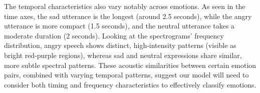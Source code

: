 \documentclass[../main.tex]{subfiles}
\begin{document}
The temporal characteristics also vary notably across emotions. As seen in the
time axes, the sad utterance is the longest (around 2.5 seconds), while the
angry utterance is more compact (1.5 seconds), and the neutral utterance takes
a moderate duration (2 seconds). Looking at the spectrograms' frequency
distribution, angry speech shows distinct, high-intensity patterns
(visible as bright red-purple regions), whereas sad and neutral expressions
share similar, more subtle spectral patterns. These acoustic similarities
between certain emotion pairs, combined with varying temporal patterns,
suggest our model will need to consider both timing and frequency
characteristics to effectively classify emotions.
\end{document}
